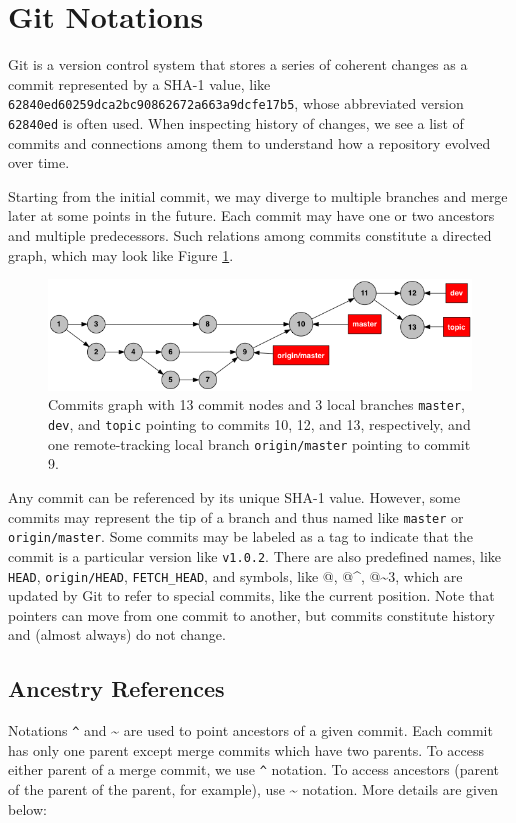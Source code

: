 \documentclass[11pt]{article}
\begin{document}
\section{Git Notations}
\label{sec:orgheadline6}
Git is a version control system that stores a series of coherent changes as a commit represented by a SHA-1 value, like \texttt{62840ed60259dca2bc90862672a663a9dcfe17b5}, whose abbreviated version \texttt{62840ed} is often used. When inspecting history of changes, we see a list of commits and connections among them to understand how a repository evolved over time.

Starting from the initial commit, we may diverge to multiple branches and merge later at some points in the future. Each commit may have one or two ancestors and multiple predecessors. Such relations among commits constitute a directed graph, which may look like Figure \ref{fig:orgparagraph1}.

\begin{figure}[htb]
\centering
\includegraphics[width=.9\linewidth]{./images/commits-graph.png}
\caption{\label{fig:orgparagraph1}
Commits graph with 13 commit nodes and 3 local branches \texttt{master}, \texttt{dev}, and \texttt{topic} pointing to commits 10, 12, and 13, respectively, and one remote-tracking local branch \texttt{origin/master} pointing to commit 9.}
\end{figure}

Any commit can be referenced by its unique SHA-1 value. However, some commits may represent the tip of a branch and thus named like \texttt{master} or \texttt{origin/master}. Some commits may be labeled as a tag to indicate that the commit is a particular version like \texttt{v1.0.2}. There are also predefined names, like \texttt{HEAD}, \texttt{origin/HEAD}, \texttt{FETCH\_HEAD}, and symbols, like @, @\^{}, @\textasciitilde{}3, which are updated by Git to refer to special commits, like the current position. Note that pointers can move from one commit to another, but commits constitute history and (almost always) do not change.

\subsection{Ancestry References}
\label{sec:orgheadline4}
Notations \texttt{\textasciicircum{}} and \textasciitilde{} are used to point ancestors of a given commit. Each commit has only one parent except merge commits which have two parents. To access either parent of a merge commit, we use \texttt{\textasciicircum{}} notation. To access ancestors (parent of the parent of the parent, for example), use \textasciitilde{} notation. More details are given below:
\end{document}
